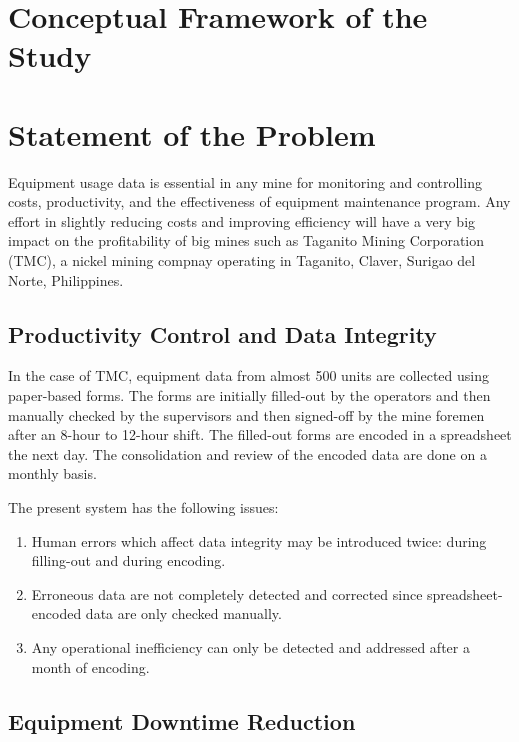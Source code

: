\documentclass[12pt]{report}
\begin{document}
\section{Conceptual Framework of the Study}

\section{Statement of the Problem}

Equipment usage data is essential in any mine for monitoring and controlling costs, productivity, and the effectiveness of equipment maintenance program.
Any effort in slightly reducing costs and improving efficiency will have a very big impact on the profitability of big mines such as Taganito Mining Corporation (TMC), a nickel mining compnay operating in Taganito, Claver, Surigao del Norte, Philippines.

\subsection{Productivity Control and Data Integrity}

In the case of TMC, equipment data from almost 500 units are collected using paper-based forms.
The forms are initially filled-out by the operators and then manually checked by the supervisors and then signed-off by the mine foremen after an 8-hour to 12-hour shift.
The filled-out forms are encoded in a spreadsheet the next day.
The consolidation and review of the encoded data are done on a monthly basis.

The present system has the following issues:

\begin{enumerate}
\item Human errors which affect data integrity may be introduced twice: during filling-out and during encoding.
\item Erroneous data are not completely detected and corrected since spreadsheet-encoded data are only checked manually.
\item Any operational inefficiency can only be detected and addressed after a month of encoding.
\end{enumerate}

\subsection{Equipment Downtime Reduction}
\end{document}
